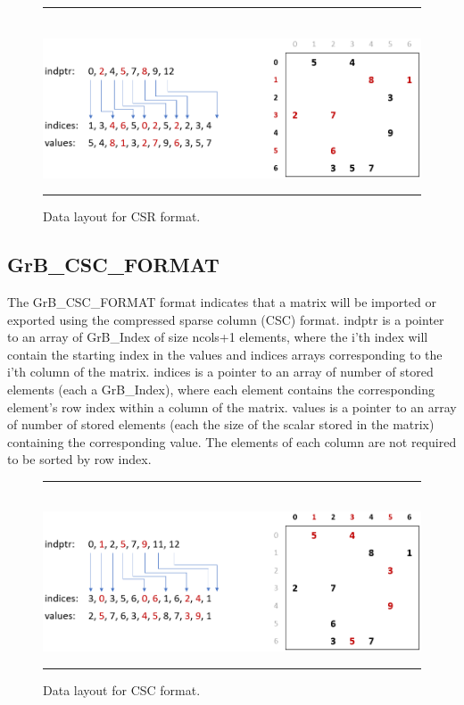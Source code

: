 \begin{figure}[h]
    \hrule
    \begin{center}
        ~\\
        \includegraphics[width=4.5in]{GrB_CSR_FORMAT.png}
    \end{center}
    \caption{Data layout for CSR format.}
    \label{Fig:formats}
    \hrule
\end{figure}

\subsection{{\sf GrB\_CSC\_FORMAT}}

The {\sf GrB\_CSC\_FORMAT} format indicates that a matrix will be imported or 
exported using the compressed sparse column (CSC) format.  {\sf indptr} is a 
pointer to an array of {\sf GrB\_Index} of size ncols+1 elements, where
the i'th index will contain the starting index in the {\sf values}
and {\sf indices} arrays corresponding to the i'th column of the matrix.
{\sf indices} is a pointer to an array of number of
stored elements (each a {\sf GrB\_Index}), where each element contains the 
corresponding element's row index within a column of the matrix.
{\sf values} is a pointer to an array of number of
stored elements (each the size of the scalar stored in the matrix) containing 
the corresponding value.  The 
elements of each column are not required to be sorted by row index.

\begin{figure}[h]
    \hrule
    \begin{center}
        ~\\
        \includegraphics[width=4.5in]{GrB_CSC_FORMAT.png}
    \end{center}
    \vspace{-1em}
    \caption{Data layout for CSC format.}
    \hrule
\end{figure}

